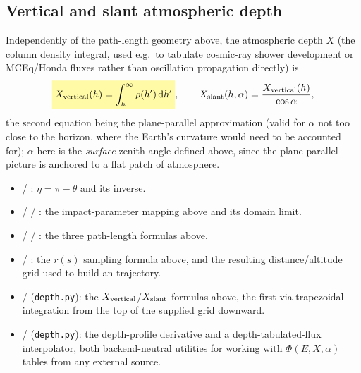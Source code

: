 \begin{theorybox}
\subsection*{Vertical and slant atmospheric depth}
Independently of the path-length geometry above, the atmospheric depth $X$
(the column density integral, used e.g.\ to tabulate cosmic-ray shower
development or MCEq/Honda fluxes rather than oscillation propagation
directly) is
\begin{equation}
  \keyresult{X_{\rm vertical}(h) = \int_h^\infty \rho(h')\,\mathrm{d}h'},
  \qquad
  X_{\rm slant}(h,\alpha) = \frac{X_{\rm vertical}(h)}{\cos\alpha},
\end{equation}
the second equation being the plane-parallel approximation (valid for
$\alpha$ not too close to the horizon, where the Earth's curvature would
need to be accounted for); $\alpha$ here is the \emph{surface} zenith
angle defined above, since the plane-parallel picture is anchored to a
flat patch of atmosphere.
\end{theorybox}

\begin{implbox}
\begin{itemize}
  \item {} / : $\eta=\pi-\theta$
    and its inverse.
  \item {} /
     /
    : the impact-parameter mapping
    above and its domain limit.
  \item {} /  /
    : the three path-length formulas
    above.
  \item {} /
    : the $r(s)$ sampling formula above,
    and the resulting distance/altitude grid used to build an
     trajectory.
  \item {} /
    (\texttt{depth.py}): the $X_{\rm vertical}$/$X_{\rm slant}$ formulas
    above, the first via trapezoidal integration from the top of the
    supplied grid downward.
  \item {} / 
    (\texttt{depth.py}): the depth-profile derivative and a
    depth-tabulated-flux interpolator, both backend-neutral utilities for
    working with $\Phi(E,X,\alpha)$ tables from any external source.
\end{itemize}
\end{implbox}

